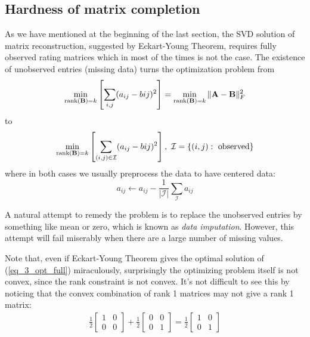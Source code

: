\documentclass[../main.tex]{subfiles}
\begin{document}
\subsection{Hardness of matrix completion}
As we have mentioned at the beginning of the last section, the SVD solution of matrix reconstruction, suggested by Eckart-Young Theorem, requires fully observed rating matrices which in most of the times is not the case. The existence of unobserved entries (missing data) turns the optimization problem from
\begin{equation}\label{eq_3_opt_full}
\min_{{\rm rank}({\bf B})=k}\left[\sum_{i,j}(a_{ij}-b{ij})^2 \right]=	\min_{{\rm rank}({\bf B})=k}\|{\bf A}-{\bf B}\|_F^2
\end{equation} 
to
\begin{equation}\label{eq_3_opt_partial}
\min_{{\rm rank}({\bf B})=k}\left[\sum_{(i,j)\in \mathcal{I}}(a_{ij}-b{ij})^2 \right],\ \mathcal{I}=\{(i,j):\ \text{observed}\}
\end{equation} 
where in both cases we usually preprocess the data to have centered data:
$$a_{ij}\leftarrow a_{ij}-\frac{1}{|\mathcal{I}|}\sum_{\mathcal{I}}a_{ij}$$
\par A natural attempt to remedy the problem is to replace the unobserved entries by something like mean or zero, which is known as \emph{data imputation}. However, this attempt will fail miserably when there are a large number of missing values. 
\par Note that, even if Eckart-Young Theorem gives the optimal solution of (\ref{eq_3_opt_full}) miraculously, surprisingly the optimizing problem itself is not convex, since the rank constraint is not convex. It's not difficult to see this by noticing that the convex combination of rank 1 matrices may not give a rank 1 matrix:
\begin{equation*}
\begin{gathered}
\frac{1}{2}\begin{bmatrix}
1 & 0 \\ 0 & 0
\end{bmatrix} + 
\frac{1}{2}\begin{bmatrix}
0 & 0 \\ 0 & 1
\end{bmatrix} =
\frac{1}{2}\begin{bmatrix}
1 & 0 \\ 0 & 1
\end{bmatrix}
\end{gathered}
\end{equation*}
\end{document}
